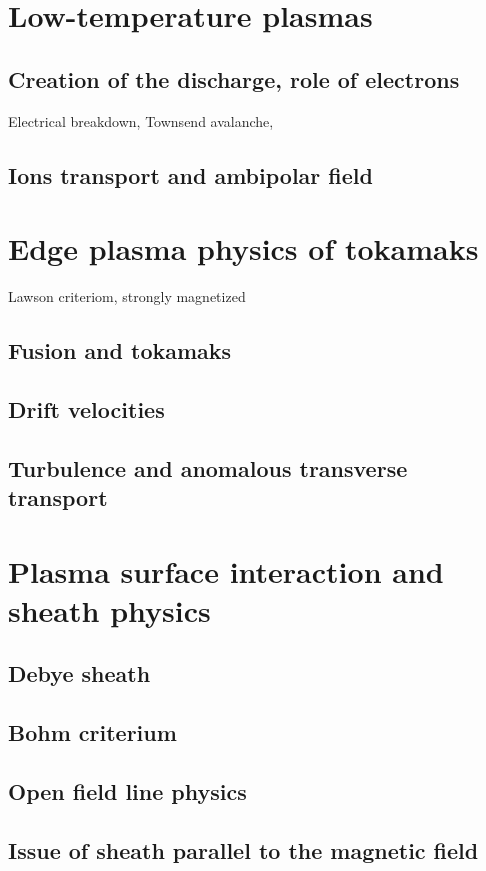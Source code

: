 	\section{Low-temperature plasmas}
		\subsection{Creation of the discharge, role of electrons}
		Electrical breakdown, Townsend avalanche, 
		\subsection{Ions transport and ambipolar field}
	\section{Edge plasma physics of tokamaks}
		Lawson criteriom, strongly magnetized
		\subsection{Fusion and tokamaks}
		\subsection{Drift velocities}
		\subsection{Turbulence and anomalous transverse transport}
	\section{Plasma surface interaction and sheath physics}
		\subsection{Debye sheath}
		\subsection{Bohm criterium}
		\subsection{Open field line physics}
		\subsection{Issue of sheath parallel to the magnetic field}

		